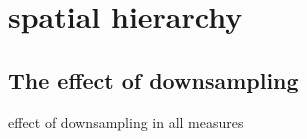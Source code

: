 \chapter{spatial hierarchy}

\section{The effect of downsampling}
effect of downsampling in all measures